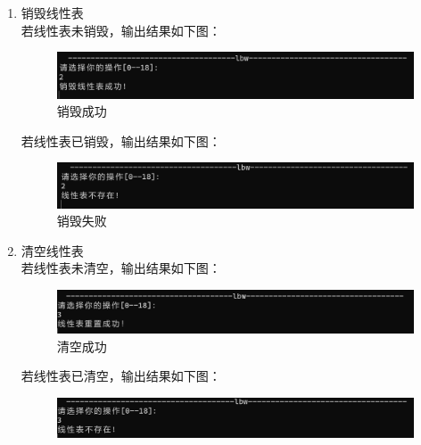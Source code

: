 \documentclass[supercite]{Experimental_Report}
\theoremstyle{definition}
\begin{document}
\begin{enumerate}
		\item 销毁线性表\\
		若线性表未销毁，输出结果如下图：
		\begin{figure}[htbp]
			\centering
			\begin{minipage}{0.7\linewidth}
				\centering
				\includegraphics[width=0.9\linewidth]{images/销毁成功.png}
			\end{minipage}
			\caption{销毁成功}
			\label{fig1-10}
		\end{figure}
		若线性表已销毁，输出结果如下图：
		\begin{figure}[htbp]
			\centering
			\begin{minipage}{0.7\linewidth}
				\centering
				\includegraphics[width=0.9\linewidth]{images/销毁失败.png}
			\end{minipage}
			\caption{销毁失败}
			\label{fig1-11}
		\end{figure}
		\item 清空线性表\\
		若线性表未清空，输出结果如下图：
		\begin{figure}[htbp]
			\centering
			\begin{minipage}{0.7\linewidth}
				\centering
				\includegraphics[width=0.9\linewidth]{images/清空成功.png}
			\end{minipage}
			\caption{清空成功}
			\label{fig1-12}
		\end{figure}
			若线性表已清空，输出结果如下图：
			\begin{figure}[htbp]
				\centering
				\begin{minipage}{0.7\linewidth}
					\centering
					\includegraphics[width=0.9\linewidth]{images/清空失败.png}
				\end{minipage}

\end{figure}
\end{enumerate}
\end{document}
